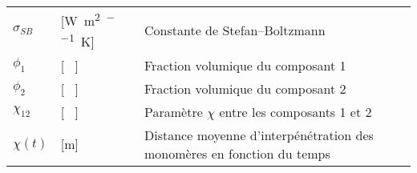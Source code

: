 \begin{longtable}{l p{2.5cm} p{4in}}
	$\sigma_{SB}$     & [\si{\watt\per\square\metre\per\raiseto{4}\kelvin}] & Constante de Stefan–Boltzmann                                                         \\
	$\phi_1$          & [ \ ]                                               & Fraction volumique du composant 1                                                     \\
	$\phi_2$          & [ \ ]                                               & Fraction volumique du composant 2                                                     \\
	$\chi_{12}$       & [ \ ]                                               & Paramètre $\chi$ entre les composants 1 et 2                                          \\
	$\chi(t)$         & [\si{\metre}]                                       & Distance moyenne d'interpénétration des monomères en fonction du temps
\end{longtable}
